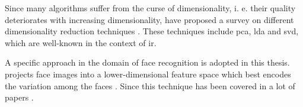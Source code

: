 Since many algorithms suffer from the curse of dimensionality, i. e. their quality deteriorates with increasing dimensionality, 
\citeauthor{dim_reduction2021} have proposed a survey on different dimensionality reduction techniques \cite{dim_reduction2021}.
These techniques include \ac{pca}, \ac{lda} and \ac{svd}, which are well-known in the context of \ac{ir}.


A specific approach in the domain of face recognition is adopted in this thesis.
\eigenfaces{} projects face images into a lower-dimensional feature space which best encodes the variation among the faces \cite{eigenfaces1991}.
Since \citeyear{eigenfaces1991} this technique has been covered in a lot of papers 
\cite{eigenfaces1991, eigenfaces1997, eigenfaces2013, face-recognition2008, face-recognition2020, face-recognition2021}.